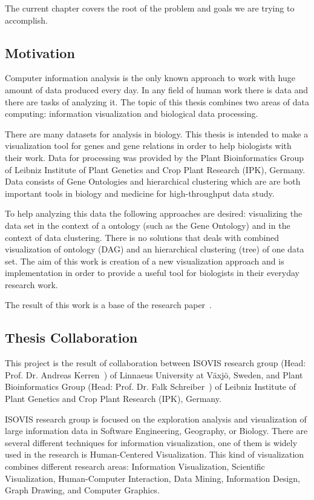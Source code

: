 
The current chapter covers the root of the problem and goals we are trying to accomplish.

\subsection{Motivation}
\label{sec:motivation}

Computer information analysis is the only known approach to work with huge amount of data produced every day. In any field of human work there is data and there are tasks of analyzing it. The topic of this thesis combines two areas of data computing: information visualization and biological data processing.

There are many datasets for analysis in biology. This thesis is intended to make a visualization tool for genes and gene relations in order to help biologists with their work. Data for processing was provided by the Plant Bioinformatics Group of Leibniz Institute of Plant Genetics and Crop Plant Research (IPK), Germany. Data consists of Gene Ontologies and hierarchical clustering which are are both important tools in biology and medicine for high-throughput data study.

To help analyzing this data the following approaches are desired: visualizing the data set in the context of a ontology (such as the Gene Ontology) and in the context of data clustering. There is no solutions that deals with combined visualization of ontology (DAG) and an hierarchical clustering (tree) of one data set. The aim of this work is creation of a new visualization approach and is implementation in order to provide a useful tool for biologists in their everyday research work.

The result of this work is a base of the research paper~\cite{MY_PAPER}.

\subsection{Thesis Collaboration}
This project is the result of collaboration between ISOVIS research group (Head: Prof. Dr. Andreas Kerren~\cite{Kerren}) of Linnaeus University at V\"axj\"o, Sweden, and Plant Bioinformatics Group (Head: Prof. Dr. Falk Schreiber~\cite{Schreiber}) of Leibniz Institute of Plant Genetics and Crop Plant Research (IPK), Germany.


ISOVIS research group is focused on the exploration analysis and visualization of large information data in Software Engineering, Geography, or Biology. There are several different techniques for information visualization, one of them is widely used in the research is Human-Centered Visualization. This kind of visualization combines different research areas: Information Visualization, Scientific Visualization, Human-Computer Interaction, Data Mining, Information Design, Graph Drawing, and Computer Graphics.


